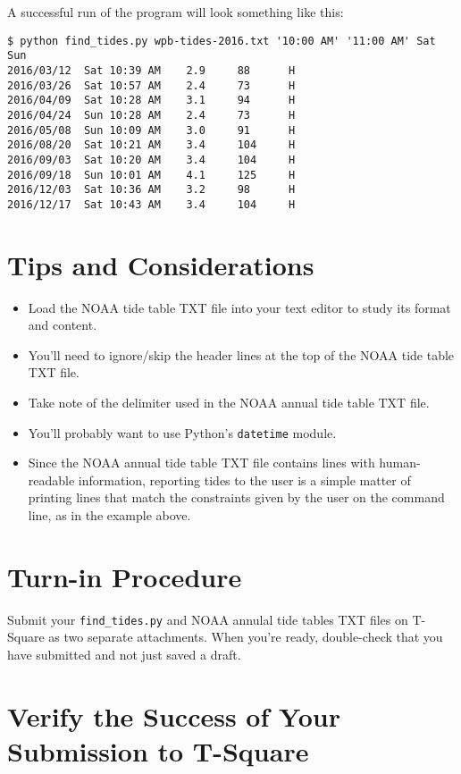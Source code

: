 \documentclass[12pt]{article}
\begin{document}
A successful run of the program will look something like this:

\begin{lstlisting}
$ python find_tides.py wpb-tides-2016.txt '10:00 AM' '11:00 AM' Sat Sun
2016/03/12	Sat	10:39 AM	2.9		88		H
2016/03/26	Sat	10:57 AM	2.4		73		H
2016/04/09	Sat	10:28 AM	3.1		94		H
2016/04/24	Sun	10:28 AM	2.4		73		H
2016/05/08	Sun	10:09 AM	3.0		91		H
2016/08/20	Sat	10:21 AM	3.4		104		H
2016/09/03	Sat	10:20 AM	3.4		104		H
2016/09/18	Sun	10:01 AM	4.1		125		H
2016/12/03	Sat	10:36 AM	3.2		98		H
2016/12/17	Sat	10:43 AM	3.4		104		H
\end{lstlisting}


\section{Tips and Considerations}

\begin{itemize}
  \itemsep0em
  \item Load the NOAA tide table TXT file into your text editor to study its format and content.
\item You'll need to ignore/skip the header lines at the top of the NOAA tide table TXT file.
\item Take note of the delimiter used in the NOAA annual tide table TXT file.
\item You'll probably want to use Python's {\tt datetime} module.
\item Since the NOAA annual tide table TXT file contains lines with human-readable information, reporting tides to the user is a simple matter of printing lines that match the constraints given by the user on the command line, as in the example above.
\end{itemize}

\section{Turn-in Procedure}

Submit your {\tt find\_tides.py} and NOAA annulal tide tables TXT files on T-Square as two separate attachments.  When you're ready, double-check that you have submitted and not just saved a draft.

\section{Verify the Success of Your Submission to T-Square}
\end{document}
